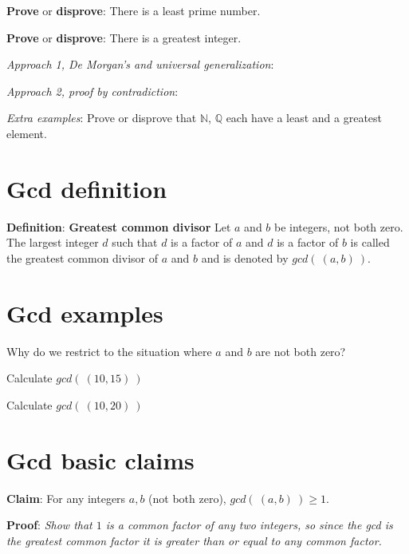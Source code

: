 \documentclass[12pt, oneside]{article}
\begin{document}
{\bf Prove} or {\bf  disprove}:  There is a least prime number.

\vspace{100pt}

{\bf Prove} or {\bf  disprove}: There is a greatest integer. 

{\it Approach 1, De Morgan's and universal generalization}: 

\vspace{100pt}

{\it Approach 2, proof by contradiction}: 

\vspace{200pt}

{\it Extra examples}: 
Prove or disprove that $\mathbb{N}$,  $\mathbb{Q}$ each have a
least and a greatest element. 
 \vfill
\section*{Gcd definition}


{\bf Definition}: {\bf Greatest common divisor} Let $a$ and $b$ be integers, not both zero. The largest integer $d$ such that 
$d$ is a  factor of $a$ and $d$ is a factor of  $b$ is called the greatest common divisor of $a$ and $b$ 
and is denoted by $gcd(~(a, b)~)$. \vfill
\section*{Gcd examples}


Why do we restrict to the situation where $a$ and $b$ are not both zero?

\vspace{50pt}


Calculate $gcd(~(10,15)~)$

\vspace{50pt}

Calculate $gcd(~(10,20)~)$

\vspace{50pt} \vfill
\section*{Gcd basic claims}


{\bf Claim}: For any integers $a,b$ (not both zero), $gcd(~(a,b)~) \geq 1$.

{\bf Proof}: {\it Show that $1$ is a common factor of any two integers, so since the gcd 
is the greatest common factor it is greater than or equal to any common factor.}

\vspace{150pt}
\end{document}

